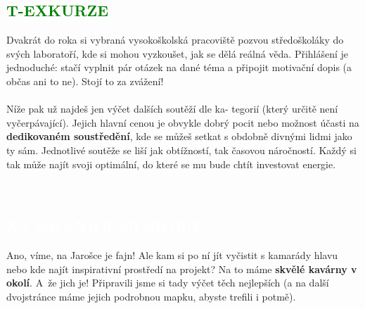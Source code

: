 \documentclass{article}
\newcommand{\nadpisy}[1]{
\vspace*{-60pt}
  \begin{nadpisboxy}
    \vspace*{20pt}
    \centering \section*{\textcolor{white}{#1}}
  \end{nadpisboxy}
}
\newcommand{\podnadpiss}[1]{
  \subsection*{\textcolor{green}{#1}}
}
\begin{document}
\podnadpiss{T-EXKURZE}
Dvakrát do roka si vybraná vysokoškolská pracoviště pozvou středoškoláky do svých laboratoří, kde si mohou vyzkoušet, jak se dělá reálná věda. Přihlášení je jednoduché: stačí vyplnit pár otázek na dané téma a připojit motivační dopis (a občas ani to ne). Stojí to za zvážení!
\\\\
\noindent Níže pak už najdeš jen výčet dalších soutěží dle ka-
tegorií (který určitě není vyčerpávající). Jejich hlavní cenou je obvykle dobrý pocit nebo možnost účasti na \textbf{dedikovaném soustředění}, kde se můžeš setkat s obdobně divnými lidmi jako ty sám. Jednotlivé soutěže se liší jak obtížností, tak časovou náročností. Každý si tak může najít svoji optimální, do které se mu bude chtít investovat energie.

\begin{greenbox}
  \textcolor{white}{
  sem patří seznam
  }
\end{greenbox}
\pagebreak

\nadpisy{ZA HRANICEMI ŠKOLY}
\enlargethispage{\pagegoal}
\noindent \small Ano, víme, na Jarošce je fajn! Ale kam si po ní jít vyčistit s kamarády hlavu nebo kde najít inspirativní prostředí na projekt? Na to máme \textbf{skvělé kavárny v okolí}. A~že jich je! Připravili jsme si tady výčet těch nejlepších (a na další dvojstránce máme jejich podrobnou mapku, abyste trefili i potmě).\\
\end{document}
